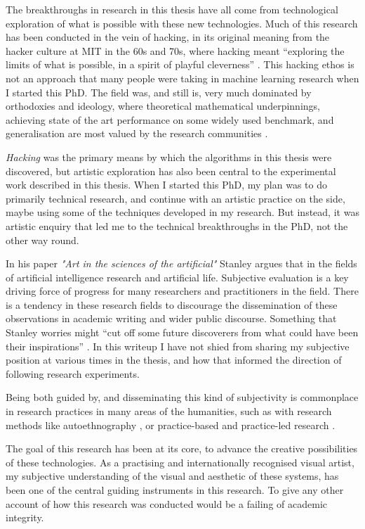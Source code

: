 The breakthroughs in research in this thesis have all come from technological exploration of what is possible with these new technologies. Much of this research has been conducted in the vein of hacking, in its original meaning from the hacker culture at MIT in the 60s and 70s, where hacking meant “exploring the limits of what is possible, in a spirit of playful cleverness” \citep{stallman2002hacking}. 
This hacking ethos is not an approach that many people were taking in machine learning research when I started this PhD. 
The field was, and still is, very much dominated by orthodoxies and ideology, where theoretical mathematical underpinnings, achieving state of the art performance on some widely used benchmark, and generalisation are most valued by the research communities \citep{birhane2022values}.

\textit{Hacking} was the primary means by which the algorithms in this thesis were discovered, but artistic exploration has also been central to the experimental work described in this thesis. 
When I started this PhD, my plan was to do primarily technical research, and continue with an artistic practice on the side, maybe using some of the techniques developed in my research. 
But instead, it was artistic enquiry that led me to the technical breakthroughs in the PhD, not the other way round. 

In his paper \textit{"Art in the sciences of the artificial"} Stanley argues that in the fields of artificial intelligence research and artificial life. 
Subjective evaluation is a key driving force of progress for many researchers and practitioners in the field. 
There is a tendency in these research fields to discourage the dissemination of these observations in academic writing and wider public discourse. 
Something that Stanley worries might “cut off some future discoverers from what could have been their inspirations” \citep{stanley2018art}. 
In this writeup I have not shied from sharing my subjective position at various times in the thesis, and how that informed the direction of following research experiments.

Being both guided by, and disseminating this kind of subjectivity is commonplace in research practices in many areas of the humanities, such as with research methods like autoethnography \citep{reed1997auto}, or practice-based and practice-led research \citep{candy2006practice}. 

The goal of this research has been at its core, to advance the creative possibilities of these technologies. 
As a practising and internationally recognised visual artist, my subjective understanding of the visual and aesthetic of these systems, has been one of the central guiding instruments in this research. 
To give any other account of how this research was conducted would be a failing of academic integrity. 

